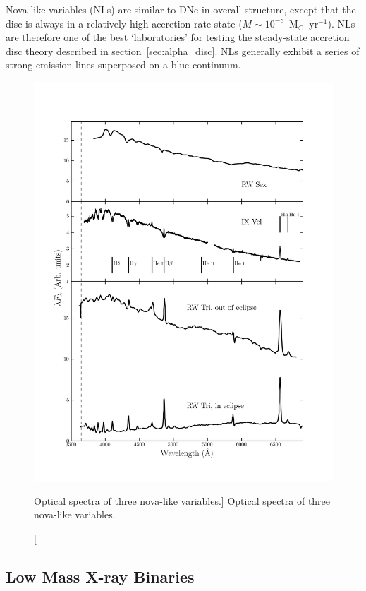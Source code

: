 Nova-like variables (NLs) are similar to DNe in overall structure,
except that the disc is always in a relatively 
high-accretion-rate state ($\dot{M} \sim 10^{-8}$~M$_{\odot}$~yr$^{-1}$).
NLs are therefore one of the best `laboratories' for testing the steady-state
accretion disc theory described in section~\ref{sec:alpha_disc}.
NLs generally exhibit a series of strong emission lines superposed on a 
blue continuum. 

\nocite{dhillon1996,hessman1984}
\begin{figure}
\centering
\includegraphics[width=1.0\textwidth]{figures/01-intro/novalikes.png}
\caption
[Optical spectra of three nova-like variables.]
{
Optical spectra of three nova-like variables.
} 
\label{fig:kording_hid}
\end{figure}




\subsection{Low Mass X-ray Binaries}

